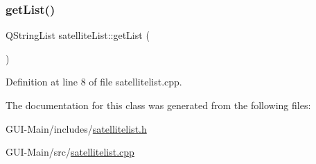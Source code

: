 \subsubsection{\texorpdfstring{get\+List()}{getList()}}
{\footnotesize\ttfamily Q\+String\+List satellite\+List\+::get\+List (\begin{DoxyParamCaption}{ }\end{DoxyParamCaption})}



Definition at line 8 of file satellitelist.\+cpp.



The documentation for this class was generated from the following files\+:\begin{DoxyCompactItemize}
\item 
G\+U\+I-\/\+Main/includes/\hyperlink{satellitelist_8h}{satellitelist.\+h}\item 
G\+U\+I-\/\+Main/src/\hyperlink{satellitelist_8cpp}{satellitelist.\+cpp}\end{DoxyCompactItemize}
